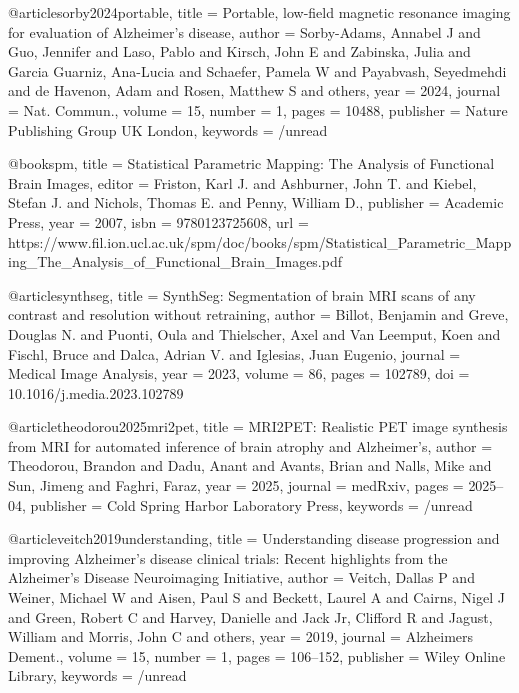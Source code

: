 @article{sorby2024portable,
  title = {Portable, low-field magnetic resonance imaging for evaluation of {{Alzheimer}}'s disease},
  author = {{Sorby-Adams}, Annabel J and Guo, Jennifer and Laso, Pablo and Kirsch, John E and Zabinska, Julia and Garcia Guarniz, Ana-Lucia and Schaefer, Pamela W and Payabvash, Seyedmehdi and {de Havenon}, Adam and Rosen, Matthew S and others},
  year = 2024,
  journal = {Nat. Commun.},
  volume = {15},
  number = {1},
  pages = {10488},
  publisher = {Nature Publishing Group UK London},
  keywords = {/unread}
}

@book{spm,
 title = {Statistical Parametric Mapping: The Analysis of Functional Brain Images},
 editor = {Friston, Karl J. and Ashburner, John T. and Kiebel, Stefan J. and Nichols, Thomas E. and Penny, William D.},
 publisher = {Academic Press},
 year = {2007},
 isbn = {9780123725608},
 url = {https://www.fil.ion.ucl.ac.uk/spm/doc/books/spm/Statistical_Parametric_Mapping_The_Analysis_of_Functional_Brain_Images.pdf}
}

@article{synthseg,
  title = {SynthSeg: Segmentation of brain MRI scans of any contrast and resolution without retraining},
  author = {Billot, Benjamin and Greve, Douglas N. and Puonti, Oula and Thielscher, Axel and Van Leemput, Koen and Fischl, Bruce and Dalca, Adrian V. and Iglesias, Juan Eugenio},
  journal = {Medical Image Analysis},
  year = {2023},
  volume = {86},
  pages = {102789},
  doi = {10.1016/j.media.2023.102789}
}

@article{theodorou2025mri2pet,
  title = {{{MRI2PET}}: {{Realistic PET}} image synthesis from {{MRI}} for automated inference of brain atrophy and {{Alzheimer}}'s},
  author = {Theodorou, Brandon and Dadu, Anant and Avants, Brian and Nalls, Mike and Sun, Jimeng and Faghri, Faraz},
  year = 2025,
  journal = {medRxiv},
  pages = {2025--04},
  publisher = {Cold Spring Harbor Laboratory Press},
  keywords = {/unread}
}

@article{veitch2019understanding,
  title = {Understanding disease progression and improving {{Alzheimer}}'s disease clinical trials: {{Recent}} highlights from the {{Alzheimer}}'s {{Disease Neuroimaging Initiative}}},
  author = {Veitch, Dallas P and Weiner, Michael W and Aisen, Paul S and Beckett, Laurel A and Cairns, Nigel J and Green, Robert C and Harvey, Danielle and Jack Jr, Clifford R and Jagust, William and Morris, John C and others},
  year = 2019,
  journal = {Alzheimers Dement.},
  volume = {15},
  number = {1},
  pages = {106--152},
  publisher = {Wiley Online Library},
  keywords = {/unread}
}

